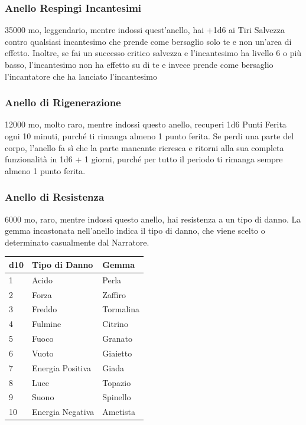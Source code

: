 \begin{multicols}{2}
	\subsubsection*{Anello Respingi Incantesimi}
	35000 mo, leggendario, mentre indossi quest'anello, hai +1d6 ai Tiri Salvezza contro qualsiasi incantesimo che prende come bersaglio solo te e non un'area di effetto. Inoltre, se fai un successo critico salvezza e l'incantesimo ha livello 6 o più basso, l'incantesimo non ha effetto su di te e invece prende come bersaglio l'incantatore che ha lanciato l'incantesimo

	\subsubsection*{Anello di Rigenerazione}
	12000 mo, molto raro, mentre indossi questo anello, recuperi 1d6 Punti Ferita ogni 10 minuti, purché ti rimanga almeno 1 punto ferita. Se perdi una parte del corpo, l'anello fa sì che la parte mancante ricresca e ritorni alla sua completa funzionalità in 1d6 + 1 giorni, purché per tutto il periodo ti rimanga sempre almeno 1 punto ferita.

	\subsubsection*{Anello di Resistenza}
	6000 mo, raro, mentre indossi questo anello, hai resistenza a un tipo di danno. La gemma incastonata nell'anello indica il tipo di danno, che viene scelto o determinato casualmente dal Narratore.

	\medskip

	\begin{tabular}{lll}
		\textbf{d10} & \textbf{Tipo di Danno} & \textbf{Gemma}\\

		\hline
		1 &Acido &Perla\\
		2& Forza &Zaffiro\\
		3& Freddo &Tormalina\\
		4& Fulmine &Citrino\\
		5& Fuoco &Granato\\
		6& Vuoto& Giaietto\\
		7& Energia Positiva &Giada\\
		8& Luce &Topazio\\
		9& Suono &Spinello\\
		10& Energia Negativa &Ametista\\
	\end{tabular}


\end{multicols}
